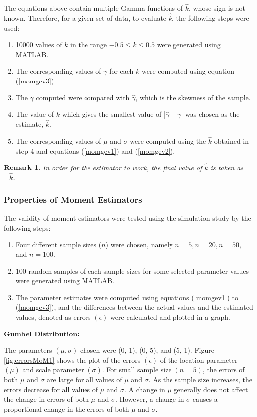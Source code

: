 \documentclass{article}
\newtheorem*{remark}{Remark}
\begin{document}
The equations above contain multiple Gamma functions of $\hat{k}$, whose sign is not known. Therefore, for a given set of data, to evaluate $\hat{k}$, the following steps were used:
\vspace{-0.3cm}
\begin{enumerate}
\item 10000 values of $k$ in the range $-0.5 \leq k \leq 0.5$ were generated using MATLAB.
\item The corresponding values of $\gamma$ for each $k$ were computed using equation (\ref{momgev3}).
\item The $\gamma$ computed were compared with $\hat{\gamma}$, which is the skewness of the sample.
\item The value of $k$ which gives the smallest value of $|\hat{\gamma}-\gamma|$ was chosen as the estimate, $\hat{k}$.
\item The corresponding values of $\mu$ and $\sigma$ were computed using the $\hat{k}$ obtained in step 4 and equations (\ref{momgev1}) and (\ref{momgev2}).
\end{enumerate}
\begin{remark}
In order for the estimator to work, the final value of $\hat{k}$ is taken as $-\hat{k}$.
\end{remark}
\vspace{-0.2cm}
\subsubsection{Properties of Moment Estimators}
The validity of moment estimators were tested using the simulation study by the following steps:
\vspace{-0.3cm}
\begin{enumerate}
\item Four different sample sizes ($n$) were chosen, namely $n = 5, n = 20, n = 50$, and $n = 100$.
\item 100 random samples of each sample sizes for some selected parameter values were generated using MATLAB.
\item The parameter estimates were computed using equations (\ref{momgev1}) to (\ref{momgev3}), and the differences between the actual values and the estimated values, denoted as errors $(\epsilon)$ were calculated and plotted in a graph.
\end{enumerate}
\underline{\textbf{Gumbel Distribution:}}

The parameters $(\mu, \sigma)$ chosen were (0, 1), (0, 5), and (5, 1).
Figure \ref{fig:errorsMoM1} shows the plot of the errors $(\epsilon)$ of the location parameter $(\mu)$ and scale parameter $(\sigma)$. For small sample size $(n=5)$, the errors of both $\mu$ and $\sigma$ are large for all values of $\mu$ and $\sigma$. As the sample size increases, the errors decrease for all values of $\mu$ and $\sigma$. A change in $\mu$ generally does not affect the change in errors of both $\mu$ and $\sigma$. However, a change in $\sigma$ causes a proportional change in the errors of both $\mu$ and $\sigma$. \vspace{0.3cm}
\end{document}
